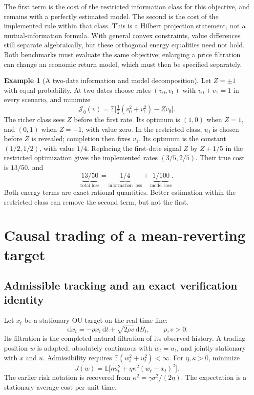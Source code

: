 \documentclass[11pt]{article}
\theoremstyle{plain}
\theoremstyle{definition}
\newtheorem{example}[theorem]{Example}
\theoremstyle{remark}
\newcommand{\E}{\mathbb E}
\newcommand{\dd}{\,\mathrm d}
\begin{document}
The first term is the cost of the restricted information class for
this objective, and remains with a perfectly estimated model.
The second is the cost of the implemented rule within that class.
This is a Hilbert projection statement, not a mutual-information
formula. With general convex constraints, value differences still
separate algebraically, but these orthogonal energy equalities
need not hold. Both benchmarks must evaluate the same objective;
enlarging a price filtration can change an economic return model,
which must then be specified separately.

\begin{example}[A two-date information and model decomposition]
\label{ex:informationtree}
Let \(Z=\pm1\) with equal probability. At two dates choose rates
\((v_0,v_1)\) with \(v_0+v_1=1\) in every scenario, and minimize
\[
\mathcal J_0(v)=
\E\big[\tfrac12(v_0^2+v_1^2)-Zv_0\big].
\]
The richer class sees \(Z\) before the first rate. Its optimum is
\((1,0)\) when \(Z=1\), and \((0,1)\) when \(Z=-1\), with value
zero. In the restricted class, \(v_0\) is chosen before \(Z\) is
revealed; completion then fixes \(v_1\). Its optimum is the constant
\((1/2,1/2)\), with value \(1/4\).
Replacing the first-date signal \(Z\) by \(Z+1/5\) in the restricted
optimization gives the implemented rates \((3/5,2/5)\).
Their true cost is \(13/50\), and
\[
\underbrace{13/50}_{\text{total loss}}
=\underbrace{1/4}_{\text{information loss}}
 +\underbrace{1/100}_{\text{model loss}}.
\]
Both energy terms are exact rational quantities. Better estimation
within the restricted class can remove the second term, but not
the first.
\end{example}

\section{Causal trading of a mean-reverting target}

\subsection{Admissible tracking and an exact verification identity}

Let \(x_t\) be a stationary OU target on the real time line:
\[
\dd x_t=-\rho x_t\dd t+\sqrt{2\rho v}\dd B_t,\qquad \rho,v>0.
\]
Its filtration is the completed natural filtration of its observed
history. A trading position \(w\) is adapted, absolutely continuous with
\(\dot w_t=u_t\), and jointly stationary with \(x\) and \(u\).
Admissibility requires \(\E(w_t^2+u_t^2)<\infty\).
For \(\eta,\kappa>0\), minimize
\[
J(w)=\E\big[\eta u_t^2+\eta\kappa^2(w_t-x_t)^2\big].
\]
The earlier risk notation is recovered from
\(\kappa^2=\gamma\sigma^2/(2\eta)\).
The expectation is a stationary average cost per unit time.
\end{document}
